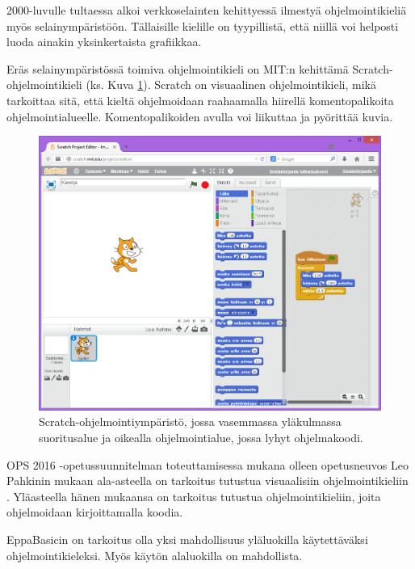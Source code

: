 2000-luvulle tultaessa alkoi
verkkoselainten kehittyessä
ilmestyä ohjelmointikieliä
myös selainympäristöön.
Tällaisille kielille on tyypillistä,
että niillä voi helposti luoda
ainakin yksinkertaista grafiikkaa.

Eräs selainympäristössä toimiva
ohjelmointikieli on
MIT:n kehittämä
Scratch-ohjelmoin\-ti\-kieli
\cite{scratch}
(ks. Kuva \ref{img:scratch}).
Scratch on visuaalinen ohjelmointikieli,
mikä tarkoittaa sitä, että
kieltä ohjelmoidaan raahaamalla
hiirellä komentopalikoita
ohjelmointialueelle.
Komentopalikoiden avulla
voi liikuttaa ja pyörittää
kuvia.

\begin{figure}[h]
    \centering
    \includegraphics[width=1\textwidth]{scratch}
    \caption{Scratch-ohjelmointiympäristö, jossa vasemmassa yläkulmassa suoritusalue ja oikealla ohjelmointialue, jossa lyhyt ohjelmakoodi.}
    \label{img:scratch}
\end{figure}


OPS 2016 -opetussuunnitelman
toteuttamisessa mukana olleen
opetusneuvos Leo Pahkinin mukaan
ala-asteella on tarkoitus tutustua
visuaalisiin ohjelmointikieliin
\cite{koodi2016_ops}.
Yläasteella hänen mukaansa
on tarkoitus tutustua
ohjelmointikieliin, joita
ohjelmoidaan kirjoittamalla koodia.

EppaBasicin on tarkoitus olla
yksi mahdollisuus yläluokilla
käytettäväksi ohjelmointikieleksi.
Myös käytön alaluokilla on
mahdollista.